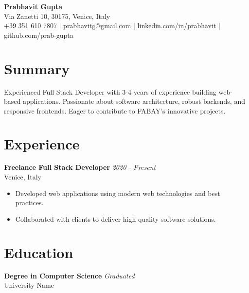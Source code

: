 \documentclass[11pt,a4paper]{article}
\begin{document}
\begin{center}
    {\Huge \textbf{Prabhavit Gupta}} \\
    \vspace{2mm}
    Via Zanetti 10, 30175, Venice, Italy \\
    +39 351 610 7807 | prabhavitg@gmail.com | linkedin.com/in/prabhavit | github.com/prab-gupta
\end{center}

\section*{Summary}
Experienced Full Stack Developer with 3-4 years of experience building web-based applications. Passionate about software architecture, robust backends, and responsive frontends. Eager to contribute to FABAY's innovative projects.

\section*{Experience}
\textbf{Freelance Full Stack Developer} \hfill \textit{2020 - Present} \\
Venice, Italy
\begin{itemize}
    \item Developed web applications using modern web technologies and best practices.
    \item Collaborated with clients to deliver high-quality software solutions.
\end{itemize}

\section*{Education}
\textbf{Degree in Computer Science} \hfill \textit{Graduated} \\
University Name
\end{document}
